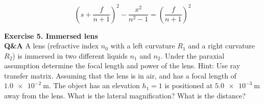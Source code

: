 \documentclass[main.tex]{subfiles}
\begin{document}
\begin{equation}\label{eq:e18}
(s + \frac{f}{n+1})^2 - \frac{x^2}{n^2-1} = (\frac{f}{n+1})^2
\end{equation}

\textbf{Exercise 5. Immersed lens}\\
\textbf{Q\&A} A lens (refractive index $n_0$ with a left curvature $R_1$ and a right curvature $R_2$) is immersed in two different liquids $n_1$ and $n_2$. Under the paraxial assumption determine the focal length and power of the lens. Hint: Use ray transfer matrix. Assuming that the lens is in air, and has a focal length of $\SI{1.0e-2}{\meter}$. The object has an elevation $h_1=1$ is positioned at $\SI{5.0e-3}{\meter}$ away from the lens. What is the lateral magnification? What is the distance?\\





\end{document}
